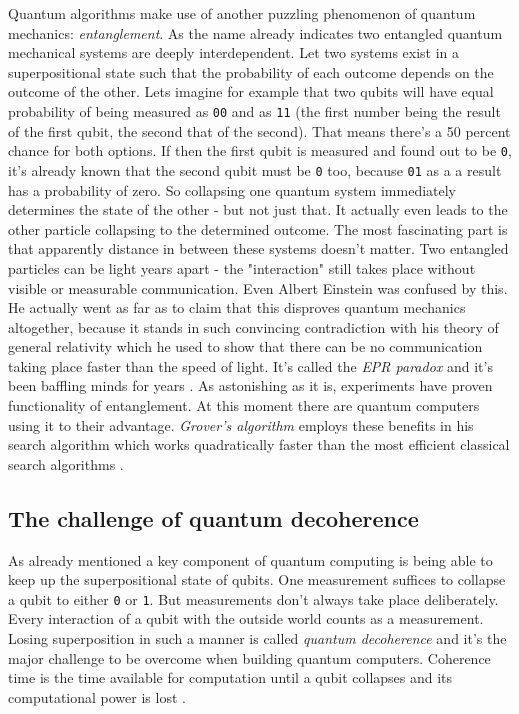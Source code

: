 Quantum algorithms make use of another puzzling phenomenon of quantum mechanics: \textit{entanglement}. As the name already indicates two entangled quantum mechanical systems are deeply interdependent. Let two systems exist in a superpositional state such that the probability of each outcome depends on the outcome of the other. Lets imagine for example that two qubits will have equal probability of being measured as \texttt{00} and as \texttt{11} (the first number being the result of the first qubit, the second that of the second). That means there's a 50 percent chance for both options. If then the first qubit is measured and found out to be \texttt{0}, it's already known that the second qubit must be \texttt{0} too, because \texttt{01} as a a result has a probability of zero. So collapsing one quantum system immediately determines the state of the other - but not just that. It actually even leads to the other particle collapsing to the determined outcome. The most fascinating part is that apparently distance in between these systems doesn't matter. Two entangled particles can be light years apart - the "interaction" still takes place without visible or measurable communication. Even Albert Einstein was confused by this. He actually went as far as to claim that this disproves quantum mechanics altogether, because it stands in such convincing contradiction with his theory of general relativity which he used to show that there can be no communication taking place faster than the speed of light. It's called the \textit{EPR paradox} and it's been baffling minds for years \cite[see][p. 250]{Kas06}. As astonishing as it is, experiments have proven functionality of entanglement. At this moment there are quantum computers using it to their advantage. \textit{Grover's algorithm} employs these benefits in his search algorithm which works quadratically faster than the most efficient classical search algorithms \cite[cp.][p. 1]{Cha13}.

\subsection{The challenge of quantum decoherence}

As already mentioned a key component of quantum computing is being able to keep up the superpositional state of qubits. One measurement suffices to collapse a qubit to either \texttt{0} or \texttt{1}. But measurements don't always take place deliberately. Every interaction of a qubit with the outside world counts as a measurement. Losing superposition in such a manner is called \textit{quantum decoherence} and it's the major challenge to be overcome when building quantum computers. Coherence time is the time available for computation until a qubit collapses and its computational power is lost \cite[see][p. 251]{Kas06}.


